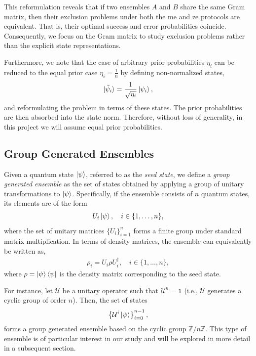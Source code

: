 \documentclass[12pt,letterpaper]{article}
\begin{document}
\begin{multicols}{2}
This reformulation reveals that if two ensembles $A$ and $B$ share the same Gram matrix, then their exclusion problems under both the \gls{me} and \gls{ze} protocols are equivalent. That is, their optimal success and error probabilities coincide. Consequently, we focus on the Gram matrix to study exclusion problems rather than the explicit state representations.

Furthermore, we note that the case of arbitrary prior probabilities $\eta_i$ can be reduced to the equal prior case $\eta_i = \frac{1}{n}$ by defining non-normalized states,
\begin{align*}
	\ket{\tilde{\psi}_i} = \frac{1}{\sqrt{\eta_i}} \ket{\psi_i},
\end{align*}
and reformulating the problem in terms of these states. The prior probabilities are then absorbed into the state norm. Therefore, without loss of generality, in this project we will assume equal prior probabilities.

\subsection{Group Generated Ensembles}\label{sectionGroupGeneratedEnsemble}

Given a quantum state $\ket{\psi}$, referred to as the \emph{seed state}, we define a \emph{group generated ensemble} as the set of states obtained by applying a group of unitary transformations to $\ket{\psi}$. Specifically, if the ensemble consists of $n$ quantum states, its elements are of the form
\begin{align*}
	U_i\ket{\psi}, \quad i \in \{1, \dots, n\},
\end{align*}
where the set of unitary matrices $\{U_i\}_{i=1}^n$ forms a finite group under standard matrix multiplication. In terms of density matrices, the ensemble can equivalently be written as,
\begin{align*}
	\rho_i = U_i \rho U_i^\dagger, \quad i \in \{1, \dots, n\},
\end{align*}
where $\rho = \ket{\psi}\bra{\psi}$ is the density matrix corresponding to the seed state.

For instance, let $\mathcal{U}$ be a unitary operator such that $\mathcal{U}^n = \mathds{1}$ (i.e., $\mathcal{U}$ generates a cyclic group of order $n$). Then, the set of states
\begin{align*}
	\left\{ \mathcal{U}^i\ket{\psi} \right\}_{i=0}^{n-1},
\end{align*}
forms a group generated ensemble based on the cyclic group $\mathbb{Z}/n\mathbb{Z}$. This type of ensemble is of particular interest in our study and will be explored in more detail in a subsequent section.


\end{multicols}
\end{document}
